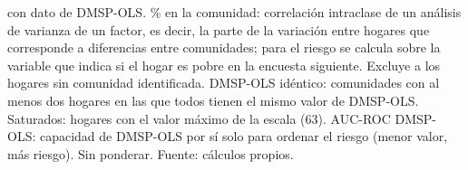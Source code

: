 \begin{table}[H]
\begin{minipage}{0.95\textwidth}
    con dato de DMSP-OLS. \% en la comunidad: correlación intraclase de un
    análisis de varianza de un factor, es decir, la parte de la variación
    entre hogares que corresponde a diferencias entre comunidades; para el
    riesgo se calcula sobre la variable que indica si el hogar es pobre en
    la encuesta siguiente. Excluye a los hogares sin comunidad identificada.
    DMSP-OLS idéntico: comunidades con al menos dos hogares en las que todos
    tienen el mismo valor de DMSP-OLS. Saturados: hogares con el valor máximo de
    la escala (63). AUC-ROC DMSP-OLS: capacidad de DMSP-OLS por sí solo para ordenar el
    riesgo (menor valor, más riesgo). Sin ponderar.
    Fuente: cálculos propios.
  \end{minipage}
\end{table}
